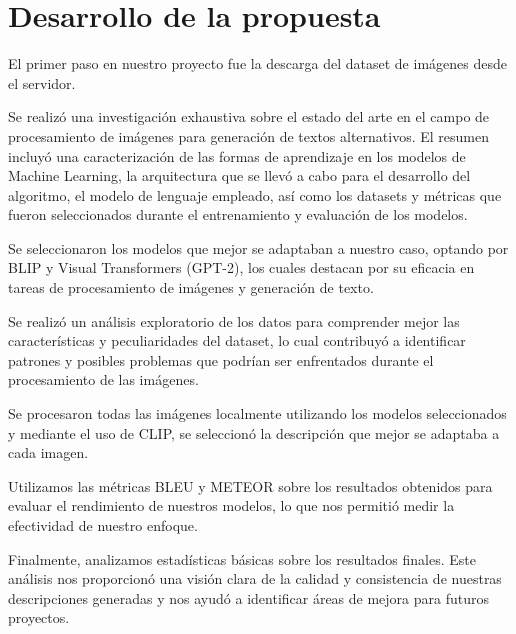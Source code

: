 \chapter{Desarrollo de la propuesta}\label{chapter:desarrollo}
El primer paso en nuestro proyecto fue la descarga del dataset de imágenes desde el servidor.

Se realizó una investigación exhaustiva sobre el estado del arte en el campo de procesamiento de imágenes para generación de textos alternativos. El resumen incluyó una caracterización de las formas de aprendizaje en los modelos de Machine Learning, la arquitectura que se llevó a cabo para el desarrollo del algoritmo, el modelo de lenguaje empleado, así como los datasets y métricas que fueron seleccionados durante el entrenamiento y evaluación de los modelos. 

Se seleccionaron los modelos que mejor se adaptaban a nuestro caso, optando por BLIP y Visual Transformers (GPT-2), los cuales destacan por su eficacia en tareas de procesamiento de imágenes y generación de texto. 

Se realizó un análisis exploratorio de los datos para comprender mejor las características y peculiaridades del dataset, lo cual contribuyó a identificar patrones y posibles problemas que podrían ser enfrentados durante el procesamiento de las imágenes.

Se procesaron todas las imágenes localmente utilizando los modelos seleccionados y mediante el uso de CLIP, se seleccionó la descripción que mejor se adaptaba a cada imagen.

Utilizamos las métricas BLEU y METEOR sobre los resultados obtenidos para evaluar el rendimiento de nuestros modelos, lo que nos permitió medir la efectividad de nuestro enfoque.

Finalmente, analizamos estadísticas básicas sobre los resultados finales. Este análisis nos proporcionó una visión clara de la calidad y consistencia de nuestras descripciones generadas y nos ayudó a identificar áreas de mejora para futuros proyectos.

